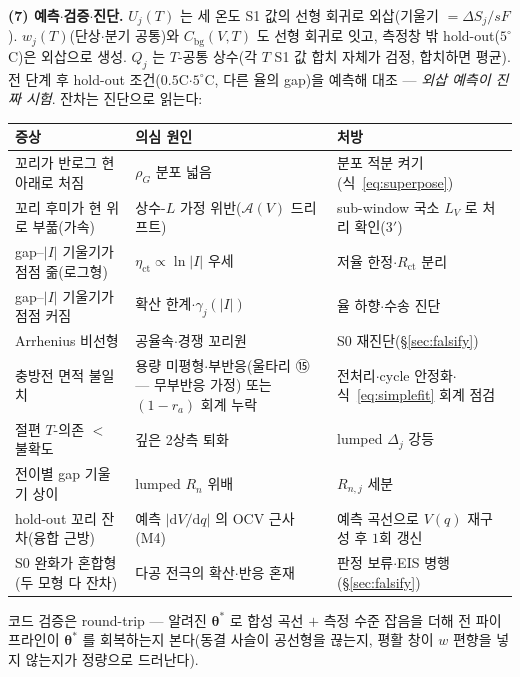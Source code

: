 \documentclass[11pt,a4paper]{article}
\newcommand{\dd}{\mathrm{d}}
\newcommand{\bg}{\mathrm{bg}}
\begin{document}
\textbf{(7) 예측$\cdot$검증$\cdot$진단.} $U_j(T)$ 는 세 온도 S1 값의 선형 회귀로 외삽(기울기 $=\Delta S_j/sF$). $w_j(T)$(단상$\cdot$분기 공통)와 $C_\bg(V,T)$ 도 선형 회귀로 잇고, 측정창 밖 hold-out($5^\circ$C)은 외삽으로 생성. $Q_j$ 는 $T$-공통 상수(각 $T$ S1 값 합치 자체가 검정, 합치하면 평균). 전 단계 후 hold-out 조건($0.5$C$\cdot$$5^\circ$C, 다른 율의 gap)을 예측해 대조 — \emph{외삽 예측이 진짜 시험}. 잔차는 진단으로 읽는다:
\begin{center}
\renewcommand{\arraystretch}{1.3}
\begin{tabular}{p{} p{} p{}}
\toprule
증상 & 의심 원인 & 처방 \\
\midrule
꼬리가 반로그 현 아래로 처짐 & $\rho_G$ 분포 넓음 & 분포 적분 켜기(식~\eqref{eq:superpose}) \\
꼬리 후미가 현 위로 부풂(가속) & 상수-$L$ 가정 위반($\mathcal A(V)$ 드리프트) & sub-window 국소 $L_V$ 로 처리 확인(3$'$) \\
gap--$|I|$ 기울기가 점점 줆(로그형) & $\eta_{\mathrm{ct}}\propto\ln|I|$ 우세 & 저율 한정$\cdot$$R_{\mathrm{ct}}$ 분리 \\
gap--$|I|$ 기울기가 점점 커짐 & 확산 한계$\cdot$$\gamma_j(|I|)$ & 율 하향$\cdot$수송 진단 \\
Arrhenius 비선형 & 공율속$\cdot$경쟁 꼬리원 & S0 재진단(\S\ref{sec:falsify}) \\
충방전 면적 불일치 & 용량 미평형$\cdot$부반응(울타리 ⑮ — 무부반응 가정) 또는 $(1{-}r_a)$ 회계 누락 & 전처리$\cdot$cycle 안정화$\cdot$식~\eqref{eq:simplefit} 회계 점검 \\
절편 $T$-의존 $<$ 불확도 & 깊은 2상측 퇴화 & lumped $\Delta_j$ 강등 \\
전이별 gap 기울기 상이 & lumped $R_n$ 위배 & $R_{n,j}$ 세분 \\
hold-out 꼬리 잔차(융합 근방) & 예측 $|\dd V/\dd q|$ 의 OCV 근사(M4) & 예측 곡선으로 $V(q)$ 재구성 후 $1$회 갱신 \\
S0 완화가 혼합형(두 모형 다 잔차) & 다공 전극의 확산$\cdot$반응 혼재 & 판정 보류$\cdot$EIS 병행(\S\ref{sec:falsify}) \\
\bottomrule
\end{tabular}
\end{center}
코드 검증은 round-trip — 알려진 $\bm\theta^\ast$ 로 합성 곡선 $+$ 측정 수준 잡음을 더해 전 파이프라인이 $\bm\theta^\ast$ 를 회복하는지 본다(동결 사슬이 공선형을 끊는지, 평활 창이 $w$ 편향을 넣지 않는지가 정량으로 드러난다).
\end{document}
